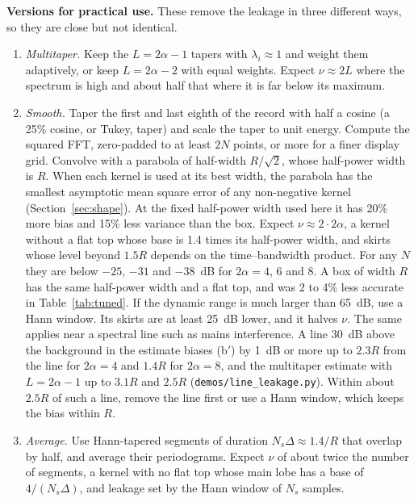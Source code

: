 \documentclass[10pt,twocolumn]{article}
\begin{document}
\begin{framed}
\noindent\textbf{Versions for practical use.} These remove the leakage in three different ways, so they are close but not identical.
\begin{enumerate}
\item[(a$'$)] \emph{Multitaper.} Keep the $L=2\alpha-1$ tapers with $\lambda_i\approx1$ and weight them adaptively, or keep $L=2\alpha-2$ with equal weights. Expect $\nu\approx2L$ where the spectrum is high and about half that where it is far below its maximum.
\item[(b$'$)] \emph{Smooth.} Taper the first and last eighth of the record with half a cosine (a 25\% cosine, or Tukey, taper) and scale the taper to unit energy. Compute the squared FFT, zero-padded to at least $2N$ points, or more for a finer display grid. Convolve with a parabola of half-width $R/\sqrt2$, whose half-power width is $R$. When each kernel is used at its best width, the parabola has the smallest asymptotic mean square error of any non-negative kernel (Section~\ref{sec:shape}). At the fixed half-power width used here it has 20\% more bias and 15\% less variance than the box. Expect $\nu\approx2\cdot2\alpha$, a kernel without a flat top whose base is 1.4 times its half-power width, and skirts whose level beyond $1.5R$ depends on the time--bandwidth product. For any $N$ they are below $-25$, $-31$ and $-38$~dB for $2\alpha=4$, 6 and 8. A box of width $R$ has the same half-power width and a flat top, and was 2 to 4\% less accurate in Table~\ref{tab:tuned}. If the dynamic range is much larger than 65~dB, use a Hann window. Its skirts are at least 25~dB lower, and it halves $\nu$. The same applies near a spectral line such as mains interference. A line 30~dB above the background in the estimate biases (b$'$) by 1~dB or more up to $2.3R$ from the line for $2\alpha=4$ and $1.4R$ for $2\alpha=8$, and the multitaper estimate with $L=2\alpha-1$ up to $3.1R$ and $2.5R$ (\texttt{demos/line\_leakage.py}). Within about $2.5R$ of such a line, remove the line first or use a Hann window, which keeps the bias within $R$.
\item[(c$'$)] \emph{Average.} Use Hann-tapered segments of duration $N_s\Delta\approx1.4/R$ that overlap by half, and average their periodograms. Expect $\nu$ of about twice the number of segments, a kernel with no flat top whose main lobe has a base of $4/(N_s\Delta)$, and leakage set by the Hann window of $N_s$ samples.
\end{enumerate}
\end{framed}
\end{document}
